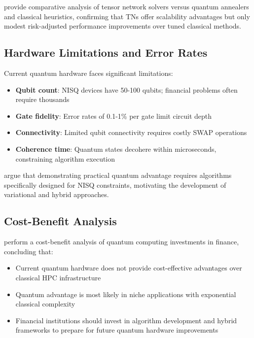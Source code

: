 \documentclass[12pt]{article}
\numberwithin{equation}{section}
\begin{document}
\citet{Mugel2022Tensor} provide comparative analysis of tensor network solvers versus quantum annealers and classical heuristics, confirming that TNs offer scalability advantages but only modest risk-adjusted performance improvements over tuned classical methods.

\subsection{Hardware Limitations and Error Rates}

Current quantum hardware faces significant limitations:

\begin{itemize}[leftmargin=*]
\item \textbf{Qubit count}: NISQ devices have 50-100 qubits; financial problems often require thousands
\item \textbf{Gate fidelity}: Error rates of 0.1-1\% per gate limit circuit depth
\item \textbf{Connectivity}: Limited qubit connectivity requires costly SWAP operations
\item \textbf{Coherence time}: Quantum states decohere within microseconds, constraining algorithm execution
\end{itemize}

\citet{Preskill2018NISQ} argue that demonstrating practical quantum advantage requires algorithms specifically designed for NISQ constraints, motivating the development of variational and hybrid approaches.

\subsection{Cost-Benefit Analysis}

\citet{Egger2020QuantumFinance} perform a cost-benefit analysis of quantum computing investments in finance, concluding that:

\begin{itemize}[leftmargin=*]
\item Current quantum hardware does not provide cost-effective advantages over classical HPC infrastructure
\item Quantum advantage is most likely in niche applications with exponential classical complexity
\item Financial institutions should invest in algorithm development and hybrid frameworks to prepare for future quantum hardware improvements
\end{itemize}
\end{document}
